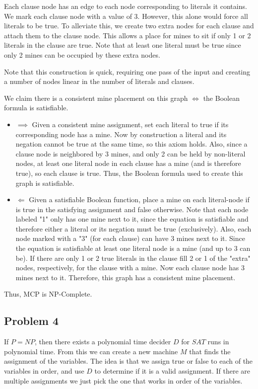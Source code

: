 \documentclass[english]{article}
\begin{document}
Each clause node has an edge to each node corresponding to literals it contains. We mark each clause
node with a value of 3. However, this alone would force all literals to be true. To alleviate this,
we create two extra nodes for each clause and attach them to the clause node. This allows a place for
mines to sit if only 1 or 2 literals in the clause are true. Note that at least one literal must be 
true since only 2 mines can be occupied by these extra nodes.

Note that this construction is quick, requiring one pass of the input and creating a number of 
nodes linear in the number of literals and clauses.

We claim there is a consistent mine placement on this graph $\iff$ the Boolean formula is satisfiable.

\begin{itemize}
	\item $\implies$
	Given a consistent mine assignment, set each literal to true if its corresponding node has a mine.
	Now by construction a literal and its negation cannot be true at the same time, so this axiom holds.
	Also, since a clause node is neighbored by 3 mines, and only 2 can be held by non-literal nodes, at
	least one literal node in each clause has a mine (and is therefore true), so each clause is true.
	Thus, the Boolean formula used to create this graph is satisfiable.
	\item $\Longleftarrow$
	Given a satisfiable Boolean function, place a mine on each literal-node if is true in the
	satisfying assignment and false otherwise. Note that each node labeled "1" only has one mine
	next to it, since the equation is satisfiable and therefore either a literal or its negation must
	be true (exclusively). Also, each node marked with a "3" (for each clause) can have 3 mines next
	to it. Since the equation is satisfiable at least one literal node is a mine (and up to 3 can be). 
	If there are only 1 or 2 true literals in the clause fill 2 or 1 of the "extra" nodes, 
	respectively, for the clause with a mine. Now each clause node has 3 mines next to it. Therefore, 
	this graph has a consistent mine placement.
\end{itemize}

Thus, MCP is NP-Complete.

\subsection*{Problem 4}
If $P = NP$, then there exists a polynomial time decider $D$ for $SAT$ runs in polynomial time. From this we can
create a new machine $M$ that finds the assignment of the variables. The idea is that we assign true or false to
each of the variables in order, and use $D$ to determine if it is a valid assignment. If there are multiple
assignments we just pick the one that works in order of the variables.
\end{document}
